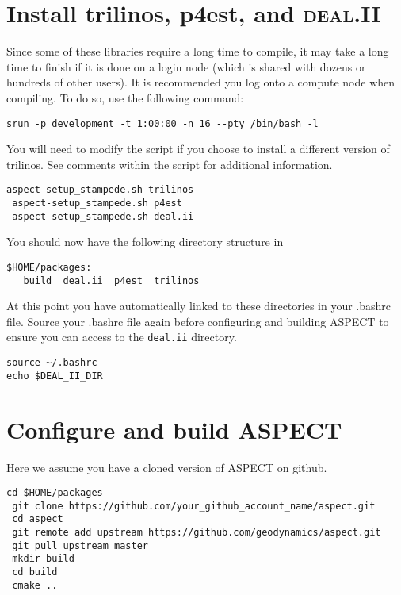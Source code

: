 \documentclass{article}
\newcommand{\dealii}{{\textsc{deal.II}}}
\newcommand{\aspect}{\textsc{ASPECT}}
\begin{document}
 \section{Install trilinos, p4est, and \dealii{}}
 
Since some of these libraries require a long time to compile, it may take a long time to
finish if it is done on a login node (which is shared with dozens or hundreds of other users).
It is recommended you log onto a compute node when compiling. To do so, use the following
command: \\

\begin{lstlisting}[frame=single,language=ksh]
 srun -p development -t 1:00:00 -n 16 --pty /bin/bash -l
\end{lstlisting}


You will need to modify the script if you choose to install a different version of trilinos.  See comments within the script for additional information.\\
 
\begin{lstlisting}[frame=single,language=ksh]
 aspect-setup_stampede.sh trilinos 
 aspect-setup_stampede.sh p4est 
 aspect-setup_stampede.sh deal.ii
\end{lstlisting}
 
 You should now have the following directory structure in 
\begin{lstlisting}[frame=single,language=ksh]
$HOME/packages:
   build  deal.ii  p4est  trilinos
\end{lstlisting}

At this point you have automatically linked to these directories in your .bashrc file. Source your .bashrc file again before configuring and building \aspect{} to ensure you can access to the \texttt{deal.ii} directory.

\begin{lstlisting}[frame=single,language=ksh]
source ~/.bashrc 
echo $DEAL_II_DIR
\end{lstlisting}

 \section{Configure and build \aspect{}}
 Here we assume you have a cloned version of \aspect{} on github.  
\begin{lstlisting}[frame=single,language=ksh]
 cd $HOME/packages 
 git clone https://github.com/your_github_account_name/aspect.git 
 cd aspect 
 git remote add upstream https://github.com/geodynamics/aspect.git 
 git pull upstream master  
 mkdir build 
 cd build 
 cmake ..  
\end{lstlisting}
\end{document}
